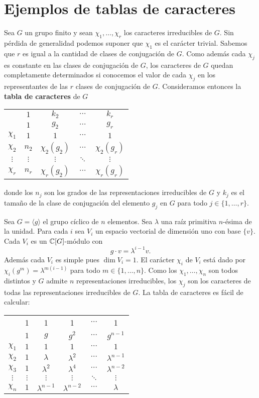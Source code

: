 \chapter{Ejemplos de tablas de caracteres}

Sea $G$ un grupo finito y sean $\chi_1,\dots,\chi_r$ los caracteres
irreducibles de $G$. Sin pérdida de generalidad podemos suponer que $\chi_1$ es
el carácter trivial.  Sabemos que $r$ es igual a la cantidad de clases de
conjugación de $G$. Como además cada $\chi_j$ es constante en las clases de
conjugación de $G$, los caracteres de $G$ quedan completamente determinados si
conocemos el valor de cada $\chi_j$ en los representantes de las $r$ clases de
conjugación de $G$. Consideramos entonces la \textbf{tabla de caracteres} de
$G$
\begin{center}
\begin{tabular}{|c|cccc|}
\hline 
 & $1$ & $k_{2}$ & $\cdots$ & $k_{r}$\tabularnewline
 & $1$ & $g_{2}$ & $\cdots$ & $g_{r}$\tabularnewline
\hline 
$\chi_{1}$ & $1$ & $1$ & $\cdots$ & $1$\tabularnewline
$\chi_{2}$ & $n_{2}$ & $\chi_{2}(g_{2})$ & $\cdots$ & $\chi_{2}(g_{r})$\tabularnewline
$\vdots$ & $\vdots$ & $\vdots$ & $\ddots$ & $\vdots$\tabularnewline
$\chi_{r}$ & $n_{r}$ & $\chi_{r}(g_{2})$ & $\cdots$ & $\chi_{r}(g_{r})$\tabularnewline
\hline
\end{tabular}
\end{center}
donde los $n_j$ son los grados de las representaciones irreducibles de $G$ y $k_j$ es el tamaño de 
la clase de conjugación del elemento $g_j$ en $G$ para todo $j\in\{1,\dots,r\}$. 

\begin{example}
	Sea $G=\langle g\rangle$ el grupo cíclico de $n$ elementos. Sea $\lambda$ una raíz primitiva
	$n$-ésima de la unidad. Para cada $i$ sea $V_i$ un espacio vectorial de
	dimensión uno con base $\{v\}$. Cada $V_i$ es un $\mathbb{C}[G]$-módulo con 
	\[
		g\cdot v=\lambda^{i-1}v.
	\]
	Además cada $V_i$ es simple pues $\dim V_i=1$. El carácter $\chi_i$ de
	$V_i$ está dado por $\chi_i(g^m)=\lambda^{m(i-1)}$ para todo
	$m\in\{1,\dots,n\}$. Como los $\chi_1,\dots,\chi_n$ son todos distintos y
	$G$ admite $n$ representaciones irreducibles, los $\chi_j$ son los
	caracteres de todas las representaciones irreducibles de $G$. La tabla de
	caracteres es fácil de calcular:
	\begin{center}
		\begin{tabular}{|c|ccccc|}
			\hline 
			& 1 & 1 & 1 & $\cdots$ & 1\tabularnewline
			& $1$ & $g$ & $g^2$ & $\cdots$ & $g^{n-1}$\tabularnewline
			\hline 
			$\chi_{1}$ & $1$ & $1$ & $1$ & $\cdots$ & $1$\tabularnewline
			$\chi_{2}$ & $1$ & $\lambda$ & $\lambda^2$ & $\cdots$ & $\lambda^{n-1}$\tabularnewline
			$\chi_{3}$ & $1$ & $\lambda^2$ & $\lambda^4$ & $\cdots$ & $\lambda^{n-2}$\tabularnewline
			$\vdots$ & $\vdots$ & $\vdots$ & $\vdots$ & $\ddots$ & $\vdots$\tabularnewline
			$\chi_{n}$ & $1$ & $\lambda^{n-1}$ & $\lambda^{n-2}$ & $\cdots$ & $\lambda$\tabularnewline
			\hline
		\end{tabular}
	\end{center}
\end{example}

